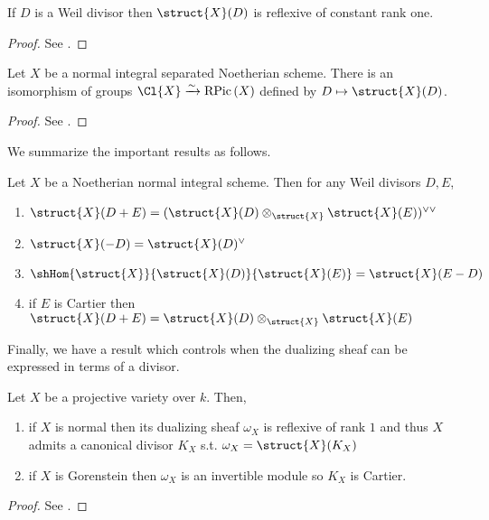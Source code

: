 \begin{prop}
If $D$ is a Weil divisor then $\struct{X}(D)$ is reflexive of constant rank one. 
\end{prop}

\begin{proof}
See \cite[Prop. 2.8]{har_reflexive}.
\end{proof}

\begin{prop} 
Let $X$ be a normal integral separated Noetherian scheme. There is an isomorphism of groups $\Cl{X} \xrightarrow{\sim} \RPic{X}$ defined by $D \mapsto \struct{X}(D)$.
\end{prop}

\begin{proof}
See \cite[\href{https://stacks.math.columbia.edu/tag/0EBM}{Tag 0EBM}]{stacks-project}.
\end{proof}
\noindent
We summarize the important results as follows.
\begin{thm} \label{properties_of_reflexive_sheaves}
Let $X$ be a Noetherian normal integral scheme. Then for any Weil divisors $D, E$,
\begin{enumerate}
\item $\struct{X}(D + E) = (\struct{X}(D) \otimes_{\struct{X}} \struct{X}(E))^{\vee \vee}$
\item $\struct{X}(-D) = \struct{X}(D)^\vee$
\item $\shHom{\struct{X}}{\struct{X}(D)}{\struct{X}(E)} = \struct{X}(E - D)$
\item if $E$ is Cartier then $\struct{X}(D + E) = \struct{X}(D) \otimes_{\struct{X}} \struct{X}(E)$
\end{enumerate}
\end{thm}
\noindent
Finally, we have a result which controls when the dualizing sheaf can be expressed in terms of a divisor.
\begin{thm} \label{canonical_reflexive}
Let $X$ be a projective variety over $k$. Then,
\begin{enumerate}
\item if $X$ is normal then its dualizing sheaf $\omega_X$ is reflexive of rank $1$ and thus $X$ admits a canonical divisor $K_X$ s.t. $\omega_X = \struct{X}(K_X)$
\item if $X$ is Gorenstein then $\omega_X$ is an invertible module so $K_X$ is Cartier.
\end{enumerate}
\end{thm}

\begin{proof}
See \cite[\href{https://stacks.math.columbia.edu/tag/0BFQ}{Tag 0BFQ}]{stacks-project}.
\end{proof}
